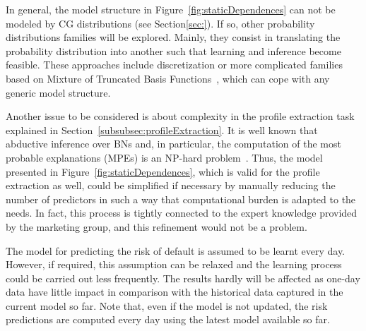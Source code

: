 In general, the model structure in Figure~\ref{fig:staticDependences} can not be modeled by CG distributions (see Section\ref{sec:}). If so, other probability distributions families will be explored. Mainly, they consist in translating the probability distribution into another such that learning and inference become feasible. These approaches include discretization or more complicated families based on Mixture of Truncated Basis Functions~\cite{Lan12}, which can cope with any generic model structure.

Another issue to be considered is about complexity in the profile extraction task explained in Section~\ref{subsubsec:profileExtraction}. It is well known that abductive inference over BNs and, in particular, the computation of the most probable explanations (MPEs) is an NP-hard problem~\cite{Shi94}. Thus, the model presented in Figure~\ref{fig:staticDependences}, which is valid for the profile extraction as well, could be simplified if necessary
by manually reducing the number of predictors in such a way that computational burden is adapted to the needs. In fact, this process is tightly connected to the expert knowledge provided by the marketing group, and this refinement would not be a problem.

The model for predicting the risk of default is assumed to be learnt every day. However, if required, this assumption can be relaxed and the learning process could be carried out less frequently. The results hardly will be affected as one-day data have little impact in comparison with the historical data captured in the current model so far. Note that, even if the model is not updated, the risk predictions are computed every day using the latest model available so far.